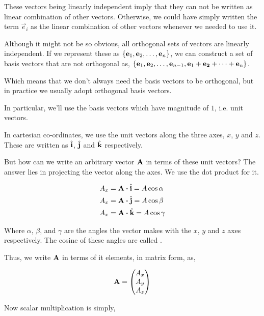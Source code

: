 These vectors being linearly independent imply that they can not be written as linear 
combination of other vectors. Otherwise, we could have simply written the term 
\(\vec{e}_i\) as the linear combination of other vectors whenever we needed to use it.

Although it might not be so obvious, all orthogonal sets of vectors are linearly 
independent. If we represent these as \(\left\{\boldsymbol{\mathbf{e}}_1, \boldsymbol{\mathbf{e}}_2, \dots, \boldsymbol{\mathbf{e}}_n\right\}\), we
can construct a set of basis vectors that are not orthogonal as,
\(\left\{\boldsymbol{\mathbf{e}}_1, \boldsymbol{\mathbf{e}}_2, \dots, \boldsymbol{\mathbf{e}}_{n-1}, \boldsymbol{\mathbf{e}}_1 + \boldsymbol{\mathbf{e_2}} + \dots + \boldsymbol{\mathbf{e}}_n\right\}\).

Which means that we don't always need the basis vectors to be orthogonal, but
in practice we usually adopt orthogonal basis vectors.

In particular, we'll use the basis vectors which have magnitude of \(1\), i.e. unit vectors.

In cartesian co-ordinates, we use the unit vectors along the three axes, \(x\), \(y\) and 
\(z\). These are written as \({\hat{\boldsymbol{\mathbf{i}}}}\), \({\hat{\boldsymbol{\mathbf{j}}}}\) and \({\hat{\boldsymbol{\mathbf{k}}}}\) respectively.

But how can we write an arbitrary vector \(\boldsymbol{\mathbf{A}}\) in terms of these unit vectors?
The answer lies in projecting the vector along the axes. We use the dot product for it.

\begin{align}
    A_x &= \Aa \dtp \unitv{i} = A \cos \alpha \\
    A_x &= \Aa \dtp \unitv{j} = A \cos \beta \\
    A_x &= \Aa \dtp \unitv{k} = A \cos \gamma 
\end{align}

Where \(\alpha\), \(\beta\), and \(\gamma\) are the angles 
the vector makes with the \(x\), \(y\) and \(z\) axes respectively.
The cosine of these angles are called . 

Thus, we write \(\boldsymbol{\mathbf{A}}\) in terms of it elements, in matrix form, as, 

\begin{equation}
    \boldsymbol{\mathbf{A}} = 
    \begin{pmatrix}
        A_x \\
        A_y \\
        A_z
    \end{pmatrix}
\end{equation}
    

Now scalar multiplication is simply, 

